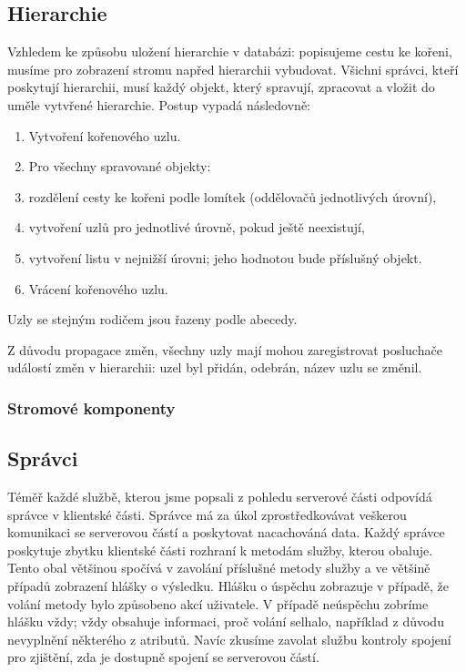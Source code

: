 \subsection{Hierarchie}

Vzhledem ke způsobu uložení hierarchie v databázi: popisujeme cestu ke kořeni, musíme pro zobrazení stromu napřed hierarchii vybudovat.
Všichni správci, kteří poskytují hierarchii, musí každý objekt, který spravují, zpracovat a vložit do uměle vytvřené hierarchie.
Postup vypadá následovně:
\begin{enumerate}
	\item Vytvoření kořenového uzlu.
	\item Pro všechny spravované objekty:
	\item rozdělení cesty ke kořeni podle lomítek (oddělovačů jednotlivých úrovní),
	\item vytvoření uzlů pro jednotlivé úrovně, pokud ještě neexistují,
	\item vytvoření listu v nejnižší úrovni; jeho hodnotou bude příslušný objekt.
	\item Vrácení kořenového uzlu.
\end{enumerate}

Uzly se stejným rodičem jsou řazeny podle abecedy.

Z důvodu propagace změn, všechny uzly mají mohou zaregistrovat posluchače událostí změn v hierarchii: uzel byl přidán, odebrán, název uzlu se změnil.

\subsubsection{Stromové komponenty}


\subsection{Správci}

Téměř každé službě, kterou jsme popsali z pohledu serverové části odpovídá správce v klientské části.
Správce má za úkol zprostředkovávat veškerou komunikaci se serverovou částí a poskytovat nacachováná data.
Každý správce poskytuje zbytku klientské části rozhraní k metodám služby, kterou obaluje.
Tento obal většinou spočívá v zavolání příslušné metody služby a ve většině případů zobrazení hlášky o výsledku.
Hlášku o úspěchu zobrazuje v případě, že volání metody bylo způsobeno akcí uživatele.
V případě neúspěchu zobríme hlášku vždy; vždy obsahuje informaci, proč volání selhalo, například z důvodu nevyplnění některého z atributů.
Navíc zkusíme zavolat službu kontroly spojení pro zjištění, zda je dostupně spojení se serverovou částí.

